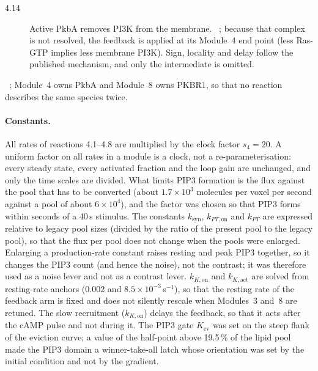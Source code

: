 \begin{description}
\item[4.14] Active PkbA removes PI3K from the membrane. ~\cite{charest2010}; because that complex is not resolved, the feedback is applied at its Module~4 end point (less Ras-GTP implies less membrane PI3K). Sign, locality and delay follow the published mechanism, and only the intermediate is omitted.
\end{description}
~\cite{meili1999,meili2000}; Module~4 owns PkbA and Module~8 owns PKBR1, so that no reaction describes the same species twice.

\paragraph{Constants.}
All rates of reactions 4.1--4.8 are multiplied by the clock factor $s_4=20$.
A uniform factor on all rates in a module is a clock, not a re-parameterisation: every steady state, every activated fraction and the loop gain are unchanged, and only the time scales are divided.
What limits PIP3 formation is the flux against the pool that has to be converted (about $1.7\times10^3$ molecules per voxel per second against a pool of about $6\times10^4$), and the factor was chosen so that PIP3 forms within seconds of a 40\,s stimulus.
The constants $k_\mathrm{syn}$, $k_{PT,\mathrm{on}}$ and $k_{PT}$ are expressed relative to legacy pool sizes (divided by the ratio of the present pool to the legacy pool), so that the flux per pool does not change when the pools were enlarged.
Enlarging a production-rate constant raises resting and peak PIP3 together, so it changes the PIP3 count (and hence the noise), not the contrast; it was therefore used as a noise lever and not as a contrast lever.
$k_{K,\mathrm{on}}$ and $k_{K,\mathrm{act}}$ are solved from resting-rate anchors (0.002 and $8.5\times10^{-3}$\,s$^{-1}$), so that the resting rate of the feedback arm is fixed and does not silently rescale when Modules~3 and~8 are retuned.
The slow recruitment ($k_{K,\mathrm{on}}$) delays the feedback, so that it acts after the cAMP pulse and not during it.
The PIP3 gate $K_\mathrm{ev}$ was set on the steep flank of the eviction curve; a value of the half-point above 19.5\,\% of the lipid pool made the PIP3 domain a winner-take-all latch whose orientation was set by the initial condition and not by the gradient.


